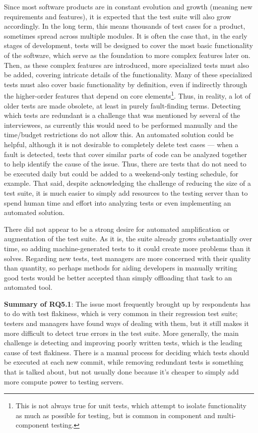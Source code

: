 Since most software products are in constant evolution and growth (meaning new requirements and features), it is expected that the test suite will also grow accordingly.
In the long term, this means thousands of test cases for a product, sometimes spread across multiple modules.
It is often the case that, in the early stages of development, tests will be designed to cover the most basic functionality of the software, which serve as the foundation to more complex features later on.
Then, as these complex features are introduced, more specialized tests must also be added, covering intricate details of the functionality.
Many of these specialized tests must also cover basic functionality by definition, even if indirectly through the higher-order features that depend on core elements\footnote{This is not always true for unit tests, which attempt to isolate functionality as much as possible for testing, but is common in component and multi-component testing.}.
Thus, in reality, a lot of older tests are made obsolete, at least in purely fault-finding terms.
Detecting which tests are redundant is a challenge that was mentioned by several of the interviewees, as currently this would need to be performed manually and the time/budget restrictions do not allow this.
An automated solution could be helpful, although it is not desirable to completely delete test cases — when a fault is detected, tests that cover similar parts of code can be analyzed together to help identify the cause of the issue.
Thus, there are tests that do not need to be executed daily but could be added to a weekend-only testing schedule, for example.
That said, despite acknowledging the challenge of reducing the size of a test suite, it is much easier to simply add resources to the testing server than to spend human time and effort into analyzing tests or even implementing an automated solution.

There did not appear to be a strong desire for automated amplification or augmentation of the test suite.
As it is, the suite already grows substantially over time, so adding machine-generated tests to it could create more problems than it solves.
Regarding new tests, test managers are more concerned with their quality than quantity, so perhaps methods for aiding developers in manually writing good tests would be better accepted than simply offloading that task to an automated tool.

\begin{tcolorbox}%
\textbf{Summary of RQ5.1}: The issue most frequently brought up by respondents has to do with test flakiness, which is very common in their regression test suite; testers and managers have found ways of dealing with them, but it still makes it more difficult to detect true errors in the test suite.
More generally, the main challenge is detecting and improving poorly written tests, which is the leading cause of test flakiness.
There is a manual process for deciding which tests should be executed at each new commit, while removing redundant tests is something that is talked about, but not usually done because it's cheaper to simply add more compute power to testing servers.
\end{tcolorbox}

